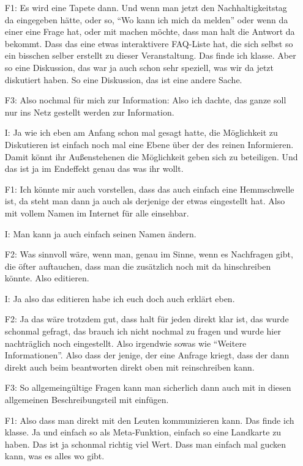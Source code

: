 \begin{itemize}
    \item[F1:] Es wird eine Tapete dann. Und wenn man jetzt den Nachhaltigkeitstag da eingegeben hätte, oder so, "`Wo kann ich mich da melden"' oder wenn da einer eine Frage hat, oder mit machen möchte, dass man halt die Antwort da bekommt. Dass das eine etwas interaktivere FAQ-Liste hat, die sich selbst so ein bisschen selber erstellt zu dieser Veranstaltung. Das finde ich klasse. Aber so eine Diskussion, das war ja auch schon sehr speziell, was wir da jetzt diskutiert haben. So eine Diskussion, das ist eine andere Sache.
    \item[F3:] Also nochmal für mich zur Information: Also ich dachte, das ganze soll nur ins Netz gestellt werden zur Information.
    \item[I:] Ja wie ich eben am Anfang schon mal gesagt hatte, die Möglichkeit zu Diskutieren ist einfach noch mal eine Ebene über der des reinen Informieren. Damit könnt ihr Außenstehenen die Möglichkeit geben sich zu beteiligen. Und das ist ja im Endeffekt genau das was ihr wollt.
    \item[F1:] Ich könnte mir auch vorstellen, dass das auch einfach eine Hemmschwelle ist, da steht man dann ja auch als derjenige der etwas eingestellt hat. Also mit vollem Namen im Internet für alle einsehbar.
    \item[I:] Man kann ja auch einfach seinen Namen ändern.
    \item[F2:] Was sinnvoll wäre, wenn man, genau im Sinne, wenn es Nachfragen gibt, die öfter auftauchen, dass man die zusätzlich noch mit da hinschreiben könnte. Also editieren.
    \item[I:] Ja also das editieren habe ich euch doch auch erklärt eben.
    \item[F2:] Ja das wäre trotzdem gut, dass halt für jeden direkt klar ist, das wurde schonmal gefragt, das brauch ich nicht nochmal zu fragen und wurde hier nachträglich noch eingestellt. Also irgendwie sowas wie "`Weitere Informationen"'. Also dass der jenige, der eine Anfrage kriegt, dass der dann direkt auch beim beantworten direkt oben mit reinschreiben kann.
    \item[F3:] So allgemeingültige Fragen kann man sicherlich dann auch mit in diesen allgemeinen Beschreibungsteil mit einfügen.
    \item[F1:] Also dass man direkt mit den Leuten kommunizieren kann. Das finde ich klasse. Ja und einfach so als Meta-Funktion, einfach so eine Landkarte zu haben. Das ist ja schonmal richtig viel Wert. Dass man einfach mal gucken kann, was es alles wo gibt.

\end{itemize}
